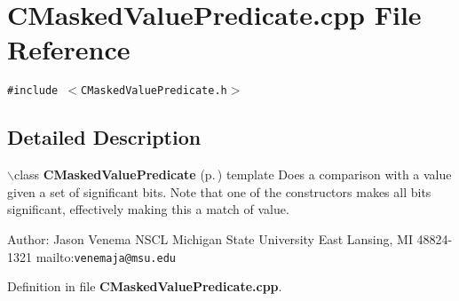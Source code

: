 \section{CMasked\-Value\-Predicate.cpp File Reference}
\label{CMaskedValuePredicate_8cpp}
{\tt \#include $<$CMasked\-Value\-Predicate.h$>$}\par


\subsection{Detailed Description}


$\backslash$class {\bf CMasked\-Value\-Predicate} {\rm (p.\,\pageref{classCMaskedValuePredicate})} template Does a comparison with a value given a set of significant bits. Note that one of the constructors makes all bits significant, effectively making this a match of value.

Author: Jason Venema NSCL Michigan State University East Lansing, MI 48824-1321 mailto:{\tt venemaja@msu.edu}



Definition in file {\bf CMasked\-Value\-Predicate.cpp}.